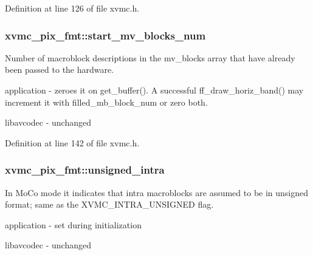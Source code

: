 Definition at line 126 of file xvmc.\+h.

\subsubsection[{\texorpdfstring{start\+\_\+mv\+\_\+blocks\+\_\+num}{start_mv_blocks_num}}]{ xvmc\+\_\+pix\+\_\+fmt\+::start\+\_\+mv\+\_\+blocks\+\_\+num}\hypertarget{structxvmc__pix__fmt_ae00f9d665842ed371cf005600f96a47c}{}\label{structxvmc__pix__fmt_ae00f9d665842ed371cf005600f96a47c}
Number of macroblock descriptions in the mv\+\_\+blocks array that have already been passed to the hardware.
\begin{DoxyItemize}
\item application -\/ zeroes it on get\+\_\+buffer(). A successful ff\+\_\+draw\+\_\+horiz\+\_\+band() may increment it with filled\+\_\+mb\+\_\+block\+\_\+num or zero both.
\item libavcodec -\/ unchanged 
\end{DoxyItemize}

Definition at line 142 of file xvmc.\+h.

\subsubsection[{\texorpdfstring{unsigned\+\_\+intra}{unsigned_intra}}]{ xvmc\+\_\+pix\+\_\+fmt\+::unsigned\+\_\+intra}\hypertarget{structxvmc__pix__fmt_a19d652ba10cd3efe9b0540fdd76cd580}{}\label{structxvmc__pix__fmt_a19d652ba10cd3efe9b0540fdd76cd580}
In Mo\+Co mode it indicates that intra macroblocks are assumed to be in unsigned format; same as the X\+V\+M\+C\+\_\+\+I\+N\+T\+R\+A\+\_\+\+U\+N\+S\+I\+G\+N\+ED flag.
\begin{DoxyItemize}
\item application -\/ set during initialization
\item libavcodec -\/ unchanged 
\end{DoxyItemize}

